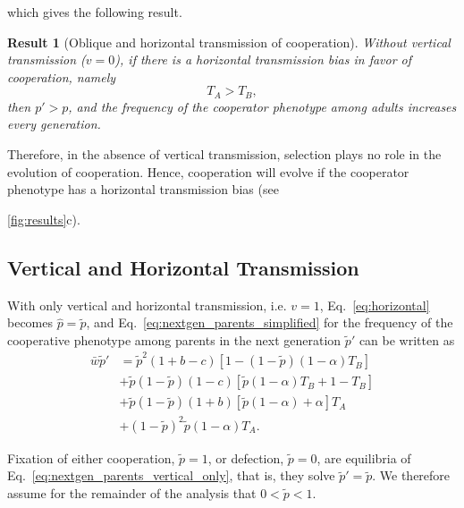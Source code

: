 \documentclass[12pt]{extarticle}
\newtheorem{result}{Result}
\begin{document}
which gives the following result.\\

\begin{result}[Oblique and horizontal transmission of cooperation] \label{result:obli_hori}
Without vertical transmission ($v=0$), if there is a horizontal transmission bias in favor of cooperation, namely
\begin{equation} \label{eq:oblique_only_result}
T_A > T_B, 
\end{equation}
then $p'>p$, and the frequency of the cooperator phenotype among adults increases every generation.
\end{result}

Therefore, in the absence of vertical transmission, selection plays no role in the evolution of cooperation. Hence, cooperation will evolve if the cooperator phenotype has a horizontal transmission bias (see~{\autoref{fig:results}c).



\subsection*{Vertical and Horizontal Transmission}

With only vertical and horizontal transmission, i.e. $v=1$, Eq.\ \ref{eq:horizontal} becomes
$\hat{p} =  \tilde{p}$,
and Eq.\ \ref{eq:nextgen_parents_simplified} for the frequency of the cooperative phenotype among parents in the next generation $\tilde{p}'$ can be written as
\begin{equation} \label{eq:nextgen_parents_vertical_only} 
\begin{aligned}
\bar{w} \tilde{p}' 
& = \tilde{p}^2 (1+b-c) [1 - (1-\tilde{p}) (1-\alpha) T_B] \\
& + \tilde{p}(1-\tilde{p}) (1-c) [\tilde{p} (1-\alpha) T_B + 1 - T_B] \\
& + \tilde{p}(1-\tilde{p}) (1+b) [\tilde{p} (1-\alpha) + \alpha] T_A \\
& + (1-\tilde{p})^2 \tilde{p} (1-\alpha) T_A .
\end{aligned}
\end{equation}

Fixation of either cooperation, $\tilde{p}=1$, or defection, 
$\tilde{p}=0$, are equilibria of Eq.\ \ref{eq:nextgen_parents_vertical_only}, that is, they solve $\tilde{p}'= \tilde{p}$.
We therefore assume for the remainder of the analysis that $0<\tilde{p}<1$.

}
\end{document}
